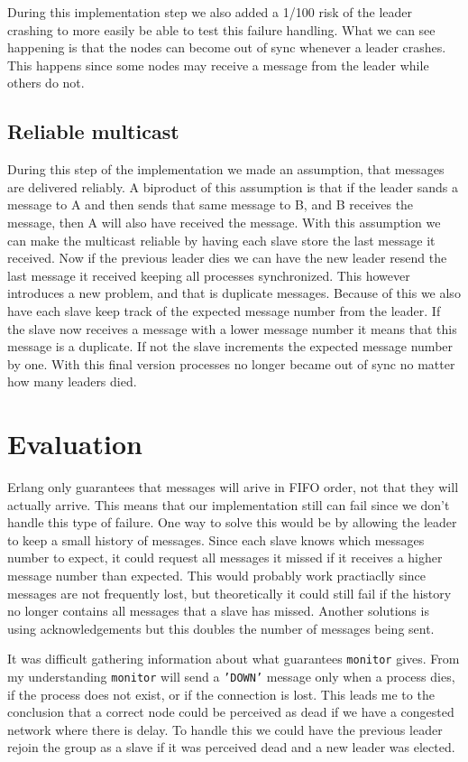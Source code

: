 \documentclass[a4paper, 11pt]{article}
\begin{document}
During this implementation step we also added a 1/100 risk of the leader crashing to more easily be able to test this failure handling. What we can see happening is that the nodes can become out of sync whenever a leader crashes. This happens since some nodes may receive a message from the leader while others do not.

\subsection{Reliable multicast}

During this step of the implementation we made an assumption, that messages are delivered reliably. A biproduct of this assumption is that if the leader sands a message to A and then sends that same message to B, and B receives the message, then A will also have received the message. With this assumption we can make the multicast reliable by having each slave store the last message it received. Now if the previous leader dies we can have the new leader resend the last message it received keeping all processes synchronized. This however introduces a new problem, and that is duplicate messages. Because of this we also have each slave keep track of the expected message number from the leader. If the slave now receives a message with a lower message number it means that this message is a duplicate. If not the slave increments the expected message number by one. With this final version processes no longer became out of sync no matter how many leaders died.

\section{Evaluation}

Erlang only guarantees that messages will arive in FIFO order, not that they will actually arrive. This means that our implementation still can fail since we don't handle this type of failure. One way to solve this would be by allowing the leader to keep a small history of messages. Since each slave knows which messages number to expect, it could request all messages it missed if it receives a higher message number than expected. This would probably work practiaclly since messages are not frequently lost, but theoretically it could still fail if the history no longer contains all messages that a slave has missed. Another solutions is using acknowledgements but this doubles the number of messages being sent.

It was difficult gathering information about what guarantees \texttt{monitor} gives. From my understanding \texttt{monitor} will send a \texttt{'DOWN'} message only when a process dies, if the process does not exist, or if the connection is lost. This leads me to the conclusion that a correct node could be perceived as dead if we have a congested network where there is delay. To handle this we could have the previous leader rejoin the group as a slave if it was perceived dead and a new leader was elected.
\end{document}
